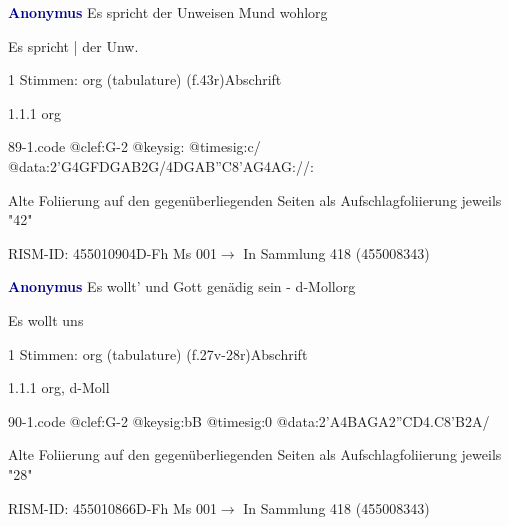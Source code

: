 \documentclass[twocolumn, 12pt]{book}
\begin{document}
\par \vspace{16pt} \textcolor{darkblue}{\textbf{Anonymus  }}\hfillplus{\textbf{[89]}}\newline Es spricht der Unweisen Mund wohl\newline org
\par \begin{itshape}[f.43r, at left:] Es spricht | der Unw.\end{itshape} 
\par \textcolor{darkblue}{}  1 Stimmen: org (tabulature)  (f.43r)\newline Abschrift
\par 1.1.1  org  
\begin{filecontents*}{89-1.code}
@clef:G-2
@keysig:
@timesig:c/
@data:2'G4GFDGAB2G/4DGAB''C{8'AG}4AG://:
\end{filecontents*}
\newline %
\par Alte Foliierung auf den gegenüberliegenden Seiten als Aufschlagfoliierung jeweils "42"
\par RISM-ID: 455010904\newline D-Fh  Ms 001\newline $\rightarrow$ In Sammlung 418 (455008343)
      
\par \vspace{16pt} \textcolor{darkblue}{\textbf{Anonymus  }}\hfillplus{\textbf{[90]}}\newline Es wollt' und Gott genädig sein - d-Moll\newline org
\par \begin{itshape}[f.27v, at left:] Es wollt uns\end{itshape} 
\par \textcolor{darkblue}{}  1 Stimmen: org (tabulature)  (f.27v-28r)\newline Abschrift
\par 1.1.1  org, d-Moll  
\begin{filecontents*}{90-1.code}
@clef:G-2
@keysig:bB
@timesig:0
@data:2'A4BAGA2''CD4.C8'B2A/
\end{filecontents*}
\newline %
\par Alte Foliierung auf den gegenüberliegenden Seiten als Aufschlagfoliierung jeweils "28"
\par RISM-ID: 455010866\newline D-Fh  Ms 001\newline $\rightarrow$ In Sammlung 418 (455008343)
      
\end{document}
